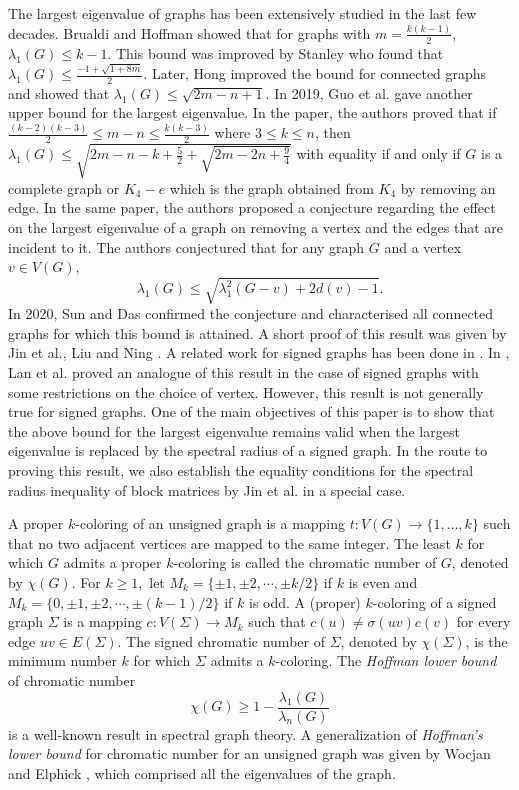 \documentclass[12pt]{article}
\theoremstyle{plain}
\numberwithin{equation}{section}
\begin{document}
	
	The largest eigenvalue of graphs has been extensively studied in the last few decades. Brualdi and Hoffman \cite{brualdi1985spectral} showed that for graphs with $m=\frac{k(k-1)}{2}$, $\lambda_1(G) \leq k-1$. This bound was improved by Stanley \cite{stanley1987bound} who found that $\lambda_1(G) \leq \frac{-1+\sqrt{1+8m}}{2}$. Later, Hong \cite{yuan1988bound} improved the bound for connected graphs and showed that $\lambda_1(G) \leq \sqrt{2m-n+1}$.  In 2019, Guo et al.\cite{guo2019sharp} gave another upper bound for the largest eigenvalue. In the paper, the authors proved that if $\frac{(k-2)(k-3)}{2}\leq m-n \leq \frac{k(k-3)}{2}$ where $3 \leq k \leq n$, then $\lambda_1(G) \leq \sqrt{2m-n-k+\frac{5}{2}+\sqrt{2m-2n+\frac{9}{4}}}$ with equality if and only if $G$ is a complete graph or $K_4-e$ which is the graph obtained from $K_4$ by removing an edge. In the same paper, the authors proposed a conjecture regarding the effect on the largest eigenvalue of a graph on removing a vertex and the edges that are incident to it. The authors conjectured that for any graph $G$ and a vertex $v \in V (G)$, \[\lambda_{1}(G) \leq \sqrt{\lambda_{1}^2(G-v)+2d(v)-1}.\] In 2020, Sun and Das \cite{sun2020conjecture} confirmed the conjecture and characterised all connected graphs for which this bound is attained. A short proof of this result was given by Jin et al.\cite{jin2024upper}, Liu and Ning \cite{MR5098803}. A related work for signed graphs has been done in \cite{xie2026index}. In \cite{lan2023remarks}, Lan et al. proved an analogue of this result in the case of signed graphs with some restrictions on the choice of vertex. However, this result is not generally true for signed graphs.  One of the main objectives of this paper is to show that the above bound for the largest eigenvalue remains valid when the largest eigenvalue is replaced by the spectral radius of a signed graph. In the route to proving this result, we also establish the equality conditions for the spectral radius inequality of block matrices by Jin et al. \cite{jin2024upper} in a special case.
	
	
	A proper $k$-coloring of an unsigned graph is a mapping $t: V(G) \rightarrow \{1, \dots, k \}$ such that no two adjacent vertices are mapped to the same integer. The least $k$ for which $G$ admits a proper $k$-coloring is called the chromatic number of $G$, denoted by $\chi(G)$. For $k\geq 1,$ let $M_{k}=\{ \pm 1, \pm 2, \cdots, \pm k/2\}$ if $k$ is even and $M_{k}=\{0, \pm 1, \pm 2, \cdots, \pm (k-1)/2\}$ if $k$ is odd. A (proper) $k$-coloring of a signed graph $\Sigma$ is a mapping $c: V(\Sigma) \rightarrow M_{k}$ such that $c(u)\neq \sigma(uv)c(v)$ for every edge $uv \in E(\Sigma)$. The signed chromatic number of $\Sigma$, denoted by $\chi(\Sigma)$, is the minimum number $k$ for which $\Sigma$ admits a $k$-coloring\cite{mavcajova2014chromatic}. The \emph{Hoffman lower bound} of chromatic number \cite{hoffman2003eigenvalues} $$\chi(G) \geq 1-\dfrac{\lambda_1(G)}{\lambda_n(G)}$$ is a well-known result in spectral graph theory. A generalization of \emph{Hoffman's lower bound} for chromatic number for an unsigned graph was given by Wocjan and Elphick \cite{wocjan2013new}, which comprised all the eigenvalues of the graph.
	
\end{document}
